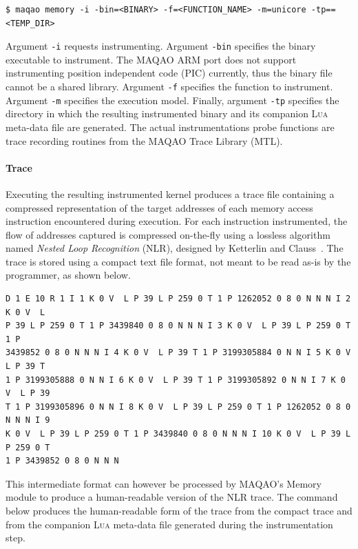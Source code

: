 \documentclass[11pt, a4paper, twoside]{montblanc2}
\def\lua{\textsc{Lua}\xspace}
\begin{document}
\begin{verbatim}
$ maqao memory -i -bin=<BINARY> -f=<FUNCTION_NAME> -m=unicore -tp==<TEMP_DIR>
\end{verbatim}

Argument \verb|-i| requests instrumenting. Argument \verb|-bin| specifies the
binary executable to instrument. The MAQAO ARM port does not support
instrumenting position independent code (PIC) currently, thus the binary file
cannot be a shared library. Argument \verb|-f| specifies the function to
instrument. Argument \verb|-m| specifies the execution model. Finally, argument
\verb|-tp| specifies the directory in which the resulting instrumented binary
and its companion \lua meta-data file are generated. The actual instrumentations 
probe functions are trace recording routines from the MAQAO Trace Library (MTL).

\paragraph{Trace}

Executing the resulting instrumented kernel produces a trace file containing a 
compressed representation of the target addresses of each memory access 
instruction encountered during execution. For each instruction instrumented, the 
flow of addresses captured is compressed on-the-fly using a lossless
algorithm named \emph{Nested Loop Recognition} (NLR), designed by Ketterlin and 
Clauss~\cite{ketterlin:nlr:cgo:2008}. The trace is stored using a compact text 
file format, not meant to be read as-is by the programmer, as shown below.

\begin{footnotesize}
\begin{verbatim}
D 1 E 10 R 1 I 1 K 0 V  L P 39 L P 259 0 T 1 P 1262052 0 8 0 N N N I 2 K 0 V  L 
P 39 L P 259 0 T 1 P 3439840 0 8 0 N N N I 3 K 0 V  L P 39 L P 259 0 T 1 P 
3439852 0 8 0 N N N I 4 K 0 V  L P 39 T 1 P 3199305884 0 N N I 5 K 0 V  L P 39 T 
1 P 3199305888 0 N N I 6 K 0 V  L P 39 T 1 P 3199305892 0 N N I 7 K 0 V  L P 39 
T 1 P 3199305896 0 N N I 8 K 0 V  L P 39 L P 259 0 T 1 P 1262052 0 8 0 N N N I 9 
K 0 V  L P 39 L P 259 0 T 1 P 3439840 0 8 0 N N N I 10 K 0 V  L P 39 L P 259 0 T 
1 P 3439852 0 8 0 N N N 
\end{verbatim}
\end{footnotesize}

This intermediate format can however be processed by MAQAO's Memory module to 
produce a human-readable version of the NLR trace. The command below produces
the human-readable form of the trace from the compact trace and from the companion
\lua meta-data file generated during the instrumentation step.
 
\end{document}
